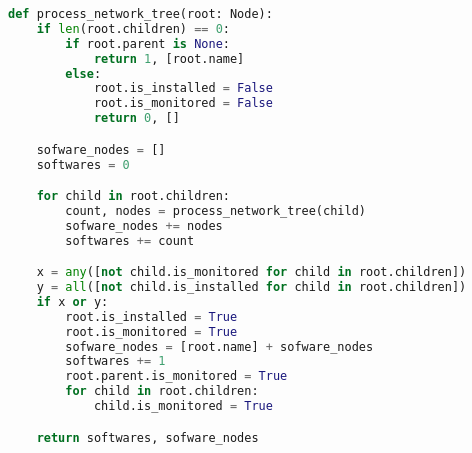 \documentclass[]{article}
\begin{document}
\begin{latin}
\begin{lstlisting}[language=python]
def process_network_tree(root: Node):
    if len(root.children) == 0:
        if root.parent is None:
            return 1, [root.name]
        else:
            root.is_installed = False
            root.is_monitored = False
            return 0, []

    sofware_nodes = []
    softwares = 0

    for child in root.children:
        count, nodes = process_network_tree(child)
        sofware_nodes += nodes
        softwares += count

    x = any([not child.is_monitored for child in root.children])
    y = all([not child.is_installed for child in root.children])
    if x or y:
        root.is_installed = True
        root.is_monitored = True
        sofware_nodes = [root.name] + sofware_nodes
        softwares += 1
        root.parent.is_monitored = True
        for child in root.children:
            child.is_monitored = True

    return softwares, sofware_nodes
\end{lstlisting}
\end{latin}
\end{document}
